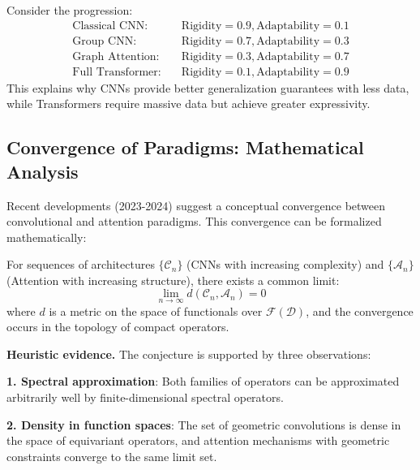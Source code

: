 \begin{example}\label{ex:analisis_espectro}
Consider the progression:
\begin{align}
    \text{Classical CNN}: &\quad \text{Rigidity} = 0.9, \text{Adaptability} = 0.1 \\
    \text{Group CNN}: &\quad \text{Rigidity} = 0.7, \text{Adaptability} = 0.3 \\
    \text{Graph Attention}: &\quad \text{Rigidity} = 0.3, \text{Adaptability} = 0.7 \\
    \text{Full Transformer}: &\quad \text{Rigidity} = 0.1, \text{Adaptability} = 0.9
\end{align}
This explains why CNNs provide better generalization guarantees with less data, while Transformers require massive data but achieve greater expressivity.
\end{example}

\subsection{Convergence of Paradigms: Mathematical Analysis}\label{subsec:convergencia_paradigmas}

Recent developments (2023-2024) suggest a conceptual convergence between convolutional and attention paradigms. This convergence can be formalized mathematically:

\begin{conjecture}\label{conj:convergencia_cnn_attention}
For sequences of architectures $\{\mathcal{C}_n\}$ (CNNs with increasing complexity) and $\{\mathcal{A}_n\}$ (Attention with increasing structure), there exists a common limit:
\begin{equation}
    \lim_{n \to \infty} d(\mathcal{C}_n, \mathcal{A}_n) = 0
\end{equation}
where $d$ is a metric on the space of functionals over $\mathcal{F}(\mathcal{D})$, and the convergence occurs in the topology of compact operators.
\end{conjecture}

\textbf{Heuristic evidence.} The conjecture is supported by three observations:

\textbf{1. Spectral approximation}: Both families of operators can be approximated arbitrarily well by finite-dimensional spectral operators.

\textbf{2. Density in function spaces}: The set of geometric convolutions is dense in the space of equivariant operators, and attention mechanisms with geometric constraints converge to the same limit set.

